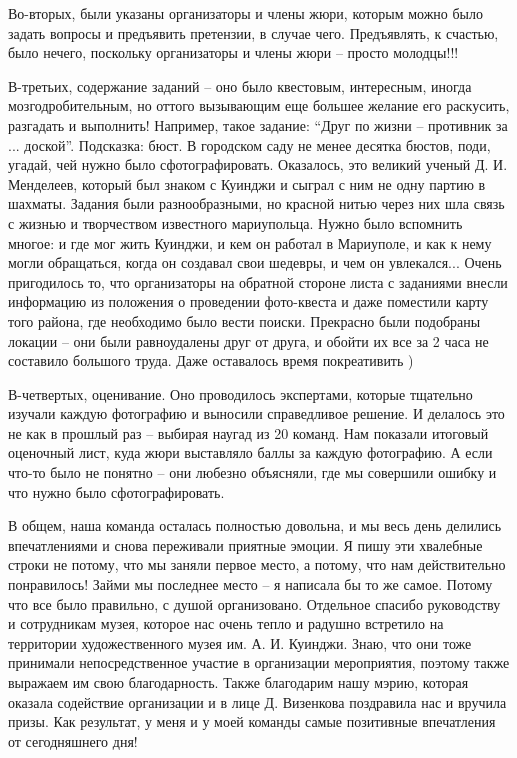 Во-вторых, были указаны организаторы и члены жюри, которым можно было задать
вопросы и предъявить претензии, в случае чего. Предъявлять, к счастью, было
нечего, поскольку организаторы и члены жюри – просто молодцы!!! 

В-третьих, содержание заданий – оно было квестовым, интересным, иногда
мозгодробительным, но оттого вызывающим еще большее желание его раскусить,
разгадать и выполнить! Например, такое задание: \enquote{Друг по жизни – противник за ...
доской}. Подсказка: бюст. В городском саду не менее десятка бюстов, поди,
угадай, чей нужно было сфотографировать. Оказалось, это великий ученый
Д. И. Менделеев, который был знаком с Куинджи и сыграл с ним не одну партию в
шахматы. Задания были разнообразными, но красной нитью через них шла связь с
жизнью и творчеством известного мариупольца. Нужно было вспомнить многое: и где
мог жить Куинджи, и кем он работал в Мариуполе, и как к нему могли обращаться,
когда он создавал свои шедевры, и чем он увлекался... Очень пригодилось то, что
организаторы на обратной стороне листа с заданиями внесли информацию из
положения о проведении фото-квеста и даже поместили карту того района, где
необходимо было вести поиски. Прекрасно были подобраны локации – они были
равноудалены друг от друга, и обойти их все за 2 часа не составило большого
труда. Даже оставалось время покреативить ) 

В-четвертых, оценивание. Оно проводилось экспертами, которые тщательно изучали
каждую фотографию и выносили справедливое решение. И делалось это не как в
прошлый раз – выбирая наугад из 20 команд. Нам показали итоговый оценочный
лист, куда жюри выставляло баллы за каждую фотографию. А если что-то было не
понятно – они любезно объясняли, где мы совершили ошибку и что нужно было
сфотографировать. 

В общем, наша команда осталась полностью довольна, и мы весь день делились
впечатлениями и снова переживали приятные эмоции. Я пишу эти хвалебные строки
не потому, что мы заняли первое место, а потому, что нам действительно
понравилось! Займи мы последнее место – я написала бы то же самое. Потому что
все было правильно, с душой организовано. Отдельное спасибо руководству и
сотрудникам музея, которое нас очень тепло и радушно встретило на территории
художественного музея им. А. И. Куинджи. Знаю, что они тоже принимали
непосредственное участие в организации мероприятия, поэтому также выражаем им
свою благодарность. Также благодарим нашу мэрию, которая оказала содействие
организации и в лице Д. Визенкова поздравила нас и вручила призы. Как результат,
у меня и у моей команды самые позитивные впечатления от сегодняшнего дня! 

